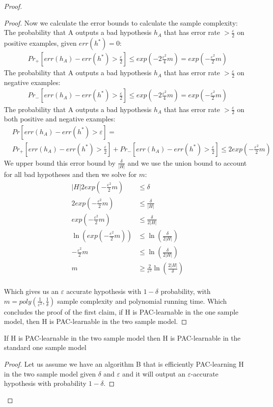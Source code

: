 \documentclass[]{homework}
\begin{document}
\begin{proof}
\begin{proof}
Now we calculate the error bounds to calculate the sample complexity: \\
The probability that A outputs a bad hypothesis $h_{A}$ that has error rate  $> \frac{\varepsilon}{2}$ on positive examples, given $err(h^*)=0$:
\begin{align*}
    Pr_+[err(h_{A}) - err(h^*) > \frac{\varepsilon}{2}] \leq exp(-2\frac{\varepsilon^2}{4}m) = exp(-\frac{\varepsilon^2}{2}m)
\end{align*}
The probability that A outputs a bad hypothesis $h_{A}$ that has error rate  $> \frac{\varepsilon}{2}$ on negative examples:
\begin{align*}
    Pr_-[err(h_{A}) - err(h^*) > \frac{\varepsilon}{2}] \leq exp(-2\frac{\varepsilon^2}{4}m) = exp(-\frac{\varepsilon^2}{2}m)
\end{align*}
The probability that A outputs a bad hypothesis $h_{A}$ that has error rate  $> \frac{\varepsilon}{2}$ on both positive and negative examples:
\begin{align*}
     &Pr[err(h_{A}) - err(h^*) > \varepsilon] = \\ &Pr_+[err(h_{A}) - err(h^*) > \frac{\varepsilon}{2}]+Pr_-[err(h_{A}) - err(h^*) >  \frac{\varepsilon}{2}] \leq 2exp(-\frac{\varepsilon^2}{2}m)
\end{align*}
We upper bound this error bound by $\frac{\delta}{|H|}$ and we use the union bound to account for all bad hypotheses and then we solve for $m$:
\begin{align*}
    |H|2exp(-\frac{\varepsilon^2}{2}m) &\leq \delta \\
    2exp(-\frac{\varepsilon^2}{2}m) &\leq  \frac{\delta}{|H|} \\
    exp(-\frac{\varepsilon^2}{2}m) &\leq \frac{\delta}{2|H|} \\
    \ln(exp(-\frac{\varepsilon^2}{2}m)) &\leq \ln(\frac{\delta}{2|H|}) \\
    -\frac{\varepsilon^2}{2}m &\leq \ln(\frac{\delta}{2|H|}) \\
    m &\geq \frac{2}{\varepsilon^2}\ln(\frac{2|H|}{\delta}) \\
\end{align*}

Which gives us an $\varepsilon$ accurate hypothesis with $1-\delta$ probability, with $m = poly(\frac{1}{\varepsilon^2},\frac{1}{\delta})$ sample complexity and polynomial running time. Which concludes the proof of the first claim, if H is PAC-learnable in the one sample model, then H is PAC-learnable in the two sample model.
\end{proof} 
\begin{claim}
If H is PAC-learnable in the two sample model then H is PAC-learnable in the standard one sample model
\end{claim}
\begin{proof}
Let us assume we have an algorithm B that is efficiently PAC-learning H in the two sample model given $\delta$ and $\varepsilon$ and it will output an $\varepsilon$-accurate hypothesis with probability $1-\delta$.


\end{proof}
\end{proof}
\end{document}
